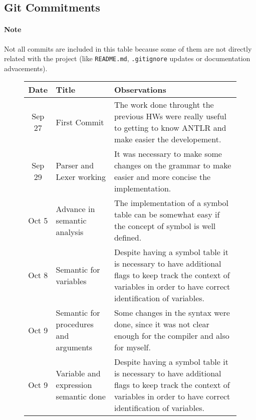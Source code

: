 \newpage

\subsection{Git Commitments}
\paragraph{Note} Not all commits are included in this table because some of
them are not directly related with the project (like \texttt{README.md},
\texttt{.gitignore} updates or documentation advacements).

\begin{figure}[h]
    \centering
    \begin{tabular}{cp{1.25in}p{2.5in}}
        \toprule
        \textbf{Date} & \textbf{Title} & \textbf{Observations}\\
        \midrule
        Sep 27 & First Commit &
        The work done throught the previous HWs were really useful to getting
        to know ANTLR and make easier the \newline developement.\\

        \midrule
        Sep 29 & Parser and Lexer working &
        It was necessary to make some changes on the grammar to make easier
        and more concise the implementation.\\

        \midrule
        Oct  5 & Advance in semantic analysis &
        The implementation of a symbol table can be somewhat easy if the
        concept of symbol is well defined.\\

        \midrule
        Oct  8 & Semantic for \newline variables &
        Despite having a symbol table it is necessary to have additional
        flags to keep track the context of variables in order to have
        correct identification of variables.\\

        \midrule
        Oct  9 & Semantic for \newline procedures and \newline arguments &
        Some changes in the syntax were done, since it was not clear enough for 
        the compiler and also for myself.\\

        \midrule
        Oct  9 & Variable and \newline expression semantic done &
        Despite having a symbol table it is necessary to have additional
        flags to keep track the context of variables in order to have
        correct identification of variables.\\


\end{tabular}
\end{figure}
